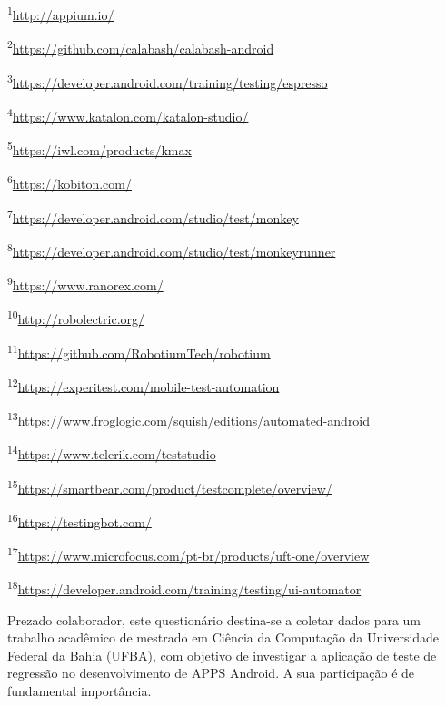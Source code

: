 \vspace{0.5cm}
\footnotesize
{
\textsuperscript{1}\url{http://appium.io/}

\textsuperscript{2}\url{https://github.com/calabash/calabash-android}

\textsuperscript{3}\url{https://developer.android.com/training/testing/espresso}

\textsuperscript{4}\url{https://www.katalon.com/katalon-studio/}

\textsuperscript{5}\url{https://iwl.com/products/kmax}

\textsuperscript{6}\url{https://kobiton.com/}

\textsuperscript{7}\url{https://developer.android.com/studio/test/monkey}

\textsuperscript{8}\url{https://developer.android.com/studio/test/monkeyrunner}

\textsuperscript{9}\url{https://www.ranorex.com/}

\textsuperscript{10}\url{http://robolectric.org/}

\textsuperscript{11}\url{https://github.com/RobotiumTech/robotium}

\textsuperscript{12}\url{https://experitest.com/mobile-test-automation}

\textsuperscript{13}\url{https://www.froglogic.com/squish/editions/automated-android}

\textsuperscript{14}\url{https://www.telerik.com/teststudio}

\textsuperscript{15}\url{https://smartbear.com/product/testcomplete/overview/}

\textsuperscript{16}\url{https://testingbot.com/}

\textsuperscript{17}\url{https://www.microfocus.com/pt-br/products/uft-one/overview}

\textsuperscript{18}\url{https://developer.android.com/training/testing/ui-automator}
}





\label{sec:formulariopesquisa}


Prezado colaborador, este questionário destina-se a coletar dados para um trabalho acadêmico de mestrado em Ciência da Computação da Universidade Federal da Bahia (UFBA), com objetivo de investigar a aplicação de teste de regressão no desenvolvimento de \ac{APPS} Android. A sua participação é de fundamental importância.



